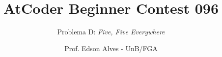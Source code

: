 \title{AtCoder Beginner Contest 096}
\subtitle{Problema D: {\it Five, Five Everywhere}}
\author{Prof. Edson Alves - UnB/FGA}
\date{}

